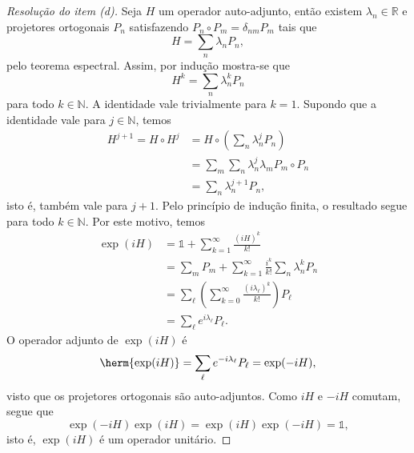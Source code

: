 \begin{proof}[Resolução do item (d)]
    Seja \(H\) um operador auto-adjunto, então existem \(\lambda_n \in \mathbb{R}\) e projetores ortogonais \(P_n\) satisfazendo \(P_n \circ P_m = \delta_{nm} P_m\) tais que
    \begin{equation*}
        H = \sum_{n} \lambda_n P_n,
    \end{equation*}
    pelo teorema espectral. Assim, por indução mostra-se que
    \begin{equation*}
        H^k = \sum_{n} \lambda_n^k P_n
    \end{equation*}
    para todo \(k \in \mathbb{N}\). A identidade vale trivialmente para \(k = 1\). Supondo que a identidade vale para \(j \in \mathbb{N}\), temos
    \begin{align*}
        H^{j + 1} = H \circ H^j &= H \circ \left(\sum_{n} \lambda_n^j P_n\right)\\
                                &= \sum_{m} \sum_{n} \lambda_n^j \lambda_m P_m \circ P_n\\
                                &= \sum_{n} \lambda_n^{j+1} P_n,
    \end{align*}
    isto é, também vale para \(j + 1\). Pelo princípio de indução finita, o resultado segue para todo \(k \in \mathbb{N}\). Por este motivo, temos
    \begin{align*}
        \exp(iH) &= \mathds{1} + \sum_{k = 1}^{\infty} \frac{(i H)^k}{k!}\\
                 &= \sum_{m} P_m + \sum_{k=1}^\infty \frac{i^k}{k!} \sum_{n} \lambda_n^k P_n\\
                 &= \sum_\ell \left(\sum_{k=0}^\infty \frac{(i \lambda_\ell)^k}{k!}\right) P_\ell\\
                 &= \sum_{\ell} e^{i \lambda_\ell} P_\ell.
    \end{align*}
    O operador adjunto de \(\exp(iH)\) é
    \begin{equation*}
        \herm{\exp(iH)} = \sum_{\ell} e^{-i \lambda_\ell} P_\ell = \exp(-iH),
    \end{equation*}
    visto que os projetores ortogonais são auto-adjuntos. Como \(iH\) e \(-iH\) comutam, segue que
    \begin{equation*}
        \exp(-iH)\exp(iH) = \exp(iH)\exp(-iH) = \mathds{1},
    \end{equation*}
    isto é, \(\exp(iH)\) é um operador unitário.
\end{proof}
